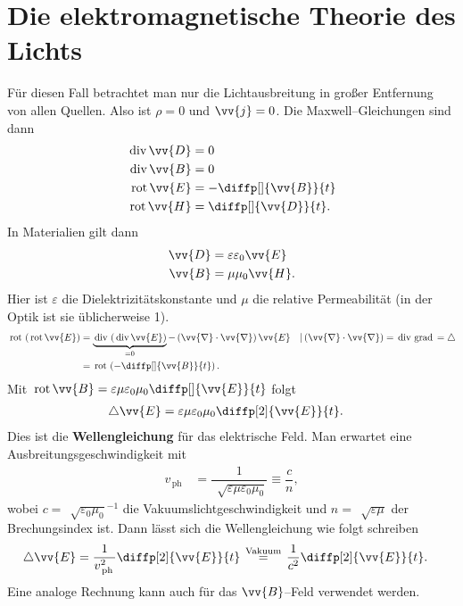 \documentclass[a4paper,12pt]{article}
\numberwithin{equation}{section}
\begin{document}
\section{Die elektromagnetische Theorie des Lichts}
Für diesen Fall betrachtet man nur die Lichtausbreitung in großer Entfernung von allen Quellen. Also ist $\rho =0$ und $\vv{j}=0$. Die Maxwell--Gleichungen sind dann
\begin{align}
        \,\text{div}\,\vv{D}&=0\\
        \,\text{div}\,\vv{B}&=0\\
        \,\text{rot}\,\vv{E}&=-\diffp[]{\vv{B}}{t}\\
        \,\text{rot}\,\vv{H}&=\diffp[]{\vv{D}}{t}
.\end{align}
In Materialien gilt dann
\begin{align} 
        \vv{D}&=\varepsilon \varepsilon _0\vv{E}\\
        \vv{B}&=\mu \mu _0\vv{H}
.\end{align} 
Hier ist $\varepsilon $ die Dielektrizitätskonstante und $\mu $ die relative Permeabilität (in der Optik ist sie üblicherweise 1). \\\indent
\begin{align} 
        \,\text{rot}\,\left(\,\text{rot}\,\vv{E}\right)&=\underbrace{\,\text{div}\,\left(\,\text{div}\,\vv{E}\right)}_{=0}-\left(\vv{\nabla }\cdot \vv{\nabla }\right)\vv{E}&&|\left(\vv{\nabla }\cdot \vv{\nabla }\right)=\,\text{div}\,\,\text{grad}\,=\triangle\\
                                                       &=\,\text{rot}\,\left(-\diffp[]{\vv{B}}{t}\right)
.\end{align} 
Mit $\,\text{rot}\,\vv{B}=\varepsilon\mu \varepsilon _0 \mu _0\diffp[]{\vv{E}}{t}$ folgt
\begin{align} 
        \triangle \vv{E}&=\varepsilon \mu \varepsilon _0\mu _0\diffp[2]{\vv{E}}{t}
.\end{align} 
Dies ist die \textbf{Wellengleichung} für das elektrische Feld. Man erwartet eine Ausbreitungsgeschwindigkeit mit
\begin{align} 
        v_{\,\text{ph}\,}&=\dfrac{1}{\,\sqrt[]{\varepsilon \mu \varepsilon _0\mu _0}}\equiv \dfrac{c}{n}
,\end{align} 
wobei $c=\,\sqrt[]{\varepsilon _0\mu _0}^{-1}$ die Vakuumslichtgeschwindigkeit und $n=\,\sqrt[]{\varepsilon \mu }$ der Brechungsindex ist. Dann lässt sich die Wellengleichung wie folgt schreiben
\begin{align} 
        \triangle \vv{E}&=\dfrac{1}{v_{\,\text{ph}\,}^2}\diffp[2]{\vv{E}}{t}\stackrel{\,\text{Vakuum}\,}{=}\dfrac{1}{c^2}\diffp[2]{\vv{E}}{t}
.\end{align} 
Eine analoge Rechnung kann auch für das $\vv{B}$--Feld verwendet werden.\\\indent
\end{document}
